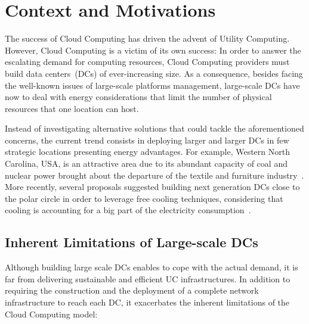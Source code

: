 \section{Context and Motivations\label{sec:intro}}

The success of Cloud Computing has driven the advent of Utility Computing. However, Cloud
Computing is a victim of its own success: In order to answer the escalating demand for
computing resources, Cloud Computing providers must build data centers~(DCs) of
ever-increasing size. As a consequence, besides facing the well-known issues of large-scale platforms
management, large-scale DCs have now to deal with energy considerations that limit the number
of physical resources that one location can host.

Instead of investigating alternative solutions that could tackle the aforementioned
concerns, the current trend consists in deploying larger and larger DCs in few strategic
locations presenting energy advantages. For example, Western North Carolina, USA, is an
attractive area due to its abundant capacity of coal and nuclear power brought about the
departure of the textile and furniture industry~\cite{greenpeace:2013}. More recently,
several proposals suggested building next generation DCs close to the polar circle in
order to leverage free cooling techniques, considering that cooling is accounting for a
big part of the electricity consumption~\cite{greenberg:sigcomm09}.

\subsection{Inherent Limitations of Large-scale DCs}

Although building large scale DCs  enables to cope with the actual demand,
it is far from delivering sustainable and efficient UC infrastructures. In addition to
requiring the construction and the deployment of a complete network infrastructure to
reach each DC, it exacerbates the inherent limitations of the Cloud Computing model:

